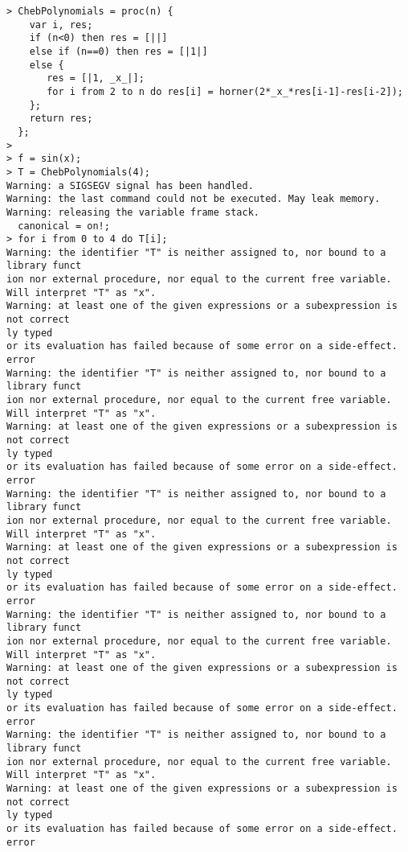 \begin{center}\begin{minipage}{15cm}\begin{Verbatim}[frame=single]
> ChebPolynomials = proc(n) {
    var i, res;
    if (n<0) then res = [||]
    else if (n==0) then res = [|1|]
    else {
       res = [|1, _x_|];
       for i from 2 to n do res[i] = horner(2*_x_*res[i-1]-res[i-2]);
    };
    return res;
  };
> 
> f = sin(x);
> T = ChebPolynomials(4);
Warning: a SIGSEGV signal has been handled.
Warning: the last command could not be executed. May leak memory.
Warning: releasing the variable frame stack.
  canonical = on!;
> for i from 0 to 4 do T[i];
Warning: the identifier "T" is neither assigned to, nor bound to a library funct
ion nor external procedure, nor equal to the current free variable.
Will interpret "T" as "x".
Warning: at least one of the given expressions or a subexpression is not correct
ly typed
or its evaluation has failed because of some error on a side-effect.
error
Warning: the identifier "T" is neither assigned to, nor bound to a library funct
ion nor external procedure, nor equal to the current free variable.
Will interpret "T" as "x".
Warning: at least one of the given expressions or a subexpression is not correct
ly typed
or its evaluation has failed because of some error on a side-effect.
error
Warning: the identifier "T" is neither assigned to, nor bound to a library funct
ion nor external procedure, nor equal to the current free variable.
Will interpret "T" as "x".
Warning: at least one of the given expressions or a subexpression is not correct
ly typed
or its evaluation has failed because of some error on a side-effect.
error
Warning: the identifier "T" is neither assigned to, nor bound to a library funct
ion nor external procedure, nor equal to the current free variable.
Will interpret "T" as "x".
Warning: at least one of the given expressions or a subexpression is not correct
ly typed
or its evaluation has failed because of some error on a side-effect.
error
Warning: the identifier "T" is neither assigned to, nor bound to a library funct
ion nor external procedure, nor equal to the current free variable.
Will interpret "T" as "x".
Warning: at least one of the given expressions or a subexpression is not correct
ly typed
or its evaluation has failed because of some error on a side-effect.
error
\end{Verbatim}
\end{minipage}\end{center}
